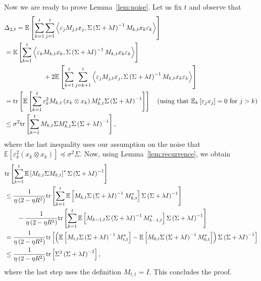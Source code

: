 \documentclass[final,12pt]{colt2018} %
\newcommand{\trace}[1]{\mbox{\normalfont tr}\left[#1\right]}
\newcommand{\EE}[1]{\mathbb{E}\left[#1\right]}
\newcommand{\EEk}[1]{\mathbb{E}_k\left[#1\right]}
\newcommand{\pa}[1]{\left(#1\right)}
\newcommand{\iprod}[2]{\left\langle#1, #2\right\rangle}
\begin{document}
Now we are ready to prove Lemma~\ref{lem:noise}. Let us fix $t$ and observe that
\begin{align*}
&\Delta_{2,t} = \EE{\sum_{k=1}^t \sum_{j=1}^t 
\iprod{\varepsilon_j M_{j,t} x_j}{\Sigma \pa{\Sigma + \lambda I}^{-1} M_{k,t} x_k \varepsilon_k}}
\\
&= \EE{\sum_{k=1}^t \iprod{\varepsilon_k M_{k,t}x_k}{\Sigma  \pa{\Sigma + \lambda I}^{-1} M_{k,t} x_k 
\varepsilon_k}} 
\\
&\qquad\qquad\qquad+ 2 \EE{\sum_{k=1}^t \sum_{j=k+1}^{t} \iprod{\varepsilon_j M_{j,t}x_j}{\Sigma \pa{\Sigma + 
\lambda I}^{-1} M_{k,t} x_k \varepsilon_k}}
\\
&= \trace{\EE{\sum_{k=1}^t \varepsilon_k^2 M_{k,t} \pa{x_k \otimes x_k} M_{k,t}^* \Sigma \pa{\Sigma + \lambda I}^{-1}}}
\quad(\mbox{using that $\EEk{\varepsilon_j x_j} = 0$ for $j> k$})
\\
&\le \sigma^2 \trace{\sum_{k=1}^t M_{k,t} \Sigma M_{k,t}^* \Sigma \pa{\Sigma + \lambda I}^{-1}},
\end{align*}
where the last inequality uses our assumption on the noise that $\EE{\varepsilon_k^2 \pa{x_k \otimes x_k}} \preccurlyeq \sigma^2 \Sigma$.
Now, using Lemma~\ref{lem:recurrence}, we obtain
\begin{align*}
 &\trace{\sum_{k=1}^t \EE{M_{k,t} \Sigma M_{k,t}}^* \Sigma \pa{\Sigma + \lambda I}^{-1}}
 \\
 &\le \frac{1}{\eta \pa{2 - \eta R^2}} \trace{\sum_{k=1}^t \EE{M_{k,t} 
\Sigma\pa{\Sigma + \lambda I}^{-1}M_{k,t}^*}  \Sigma 
\pa{\Sigma + \lambda I}^{-1}}
\\
&\qquad - \frac{1}{\eta \pa{2 - \eta R^2}} \trace{\sum_{k=1}^t \EE{M_{k-1,t} 
\Sigma\pa{\Sigma + \lambda I}^{-1}M_{k-1,t}^*}  \Sigma 
\pa{\Sigma + \lambda I}^{-1}}
 \\
 &= \frac{1}{\eta \pa{2 - \eta R^2}} \trace{\pa{\EE{M_{t,t} 
\Sigma\pa{\Sigma + \lambda I}^{-1}M_{t,t}^*} - \EE{M_{0,t} \Sigma\pa{\Sigma + \lambda I}^{-1}M_{0,t}^*}} \Sigma 
\pa{\Sigma + \lambda I}^{-1}}
 \\
 &\le \frac{1}{\eta \pa{2 - \eta R^2}} \trace{\Sigma^2 \pa{\Sigma + \lambda I}^{-2}},
\end{align*}
where the last step uses the definition $M_{t,t} = I$. This concludes the proof.
\jmlrQED
\end{document}
